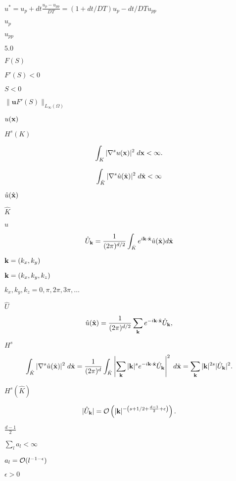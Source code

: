 \documentclass{article}
\begin{document}
$u^\ast = u_p + dt \frac{u_p-u_{pp}}{DT} = (1+dt/DT)u_p - dt/DT u_{pp}$
\pagebreak

$u_p$
\pagebreak

$u_{pp}$
\pagebreak

$5.0$
\pagebreak

$F(S)$
\pagebreak

$F'(S)<0$
\pagebreak

$S<0$
\pagebreak

$\|\mathbf{u} F'(S)\|_{L_\infty(\Omega)}$
\pagebreak

$u({\bf x})$
\pagebreak

$H^s(K)$
\pagebreak

\[ \int_K |\nabla^s u({\bf x})|^2 \; d{\bf x} < \infty. \]
\pagebreak

\[ \int_{\hat K} |\nabla^s \hat u(\hat{\bf x})|^2 \; d\hat{\bf x} < \infty \]
\pagebreak

$\hat u(\hat{\bf x})$
\pagebreak

$\hat K$
\pagebreak

$\hat u$
\pagebreak

\[ \hat U_{\bf k} = \frac 1{(2\pi)^{d/2}} \int_{\hat K} e^{i {\bf k}\cdot \hat{\bf x}} \hat u(\hat{\bf x}) d\hat{\bf x} \]
\pagebreak

${\bf k}=(k_x,k_y)$
\pagebreak

${\bf k}=(k_x,k_y,k_z)$
\pagebreak

$k_x,k_y,k_z=0,\pi,2\pi,3\pi,\ldots$
\pagebreak

$\hat U$
\pagebreak

\[ \hat u(\hat{\bf x}) = \frac 1{(2\pi)^{d/2}} \sum_{\bf k} e^{-i {\bf k}\cdot \hat{\bf x}} \hat U_{\bf k}, \]
\pagebreak

$H^s$
\pagebreak

\[ \int_{\hat K} |\nabla^s \hat u(\hat{\bf x})|^2 \; d\hat{\bf x} = \frac 1{(2\pi)^d} \int_{\hat K} \left| \sum_{\bf k} |{\bf k}|^s e^{-i{\bf k}\cdot \hat{\bf x}} \hat U_{\bf k} \right|^2 \; d\hat{\bf x} = \sum_{\bf k} |{\bf k}|^{2s} |\hat U_{\bf k}|^2. \]
\pagebreak

$H^s(\hat K)$
\pagebreak

\[ |\hat U_{\bf k}| = {\cal O}\left(|{\bf k}|^{-\left(s+1/2+\frac{d-1}{2}+\epsilon\right)}\right). \]
\pagebreak

$\frac{d-1}2$
\pagebreak

$\sum_l a_l < \infty$
\pagebreak

$a_l = {\cal O}(l^{-1-\epsilon})$
\pagebreak

$\epsilon>0$
\pagebreak
\end{document}
